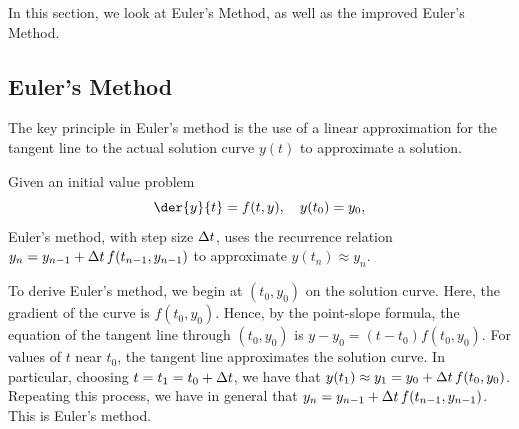 In this section, we look at Euler's Method, as well as the improved Euler's Method.

\subsection{Euler's Method}

The key principle in Euler's method is the use of a linear approximation for the tangent line to the actual solution curve $y(t)$ to approximate a solution.

\begin{recipe}
    Given an initial value problem \[\der{y}{t} = f(t, y), \quad y(t_0) = y_0,\] Euler's method,  with step size $\Delta t$, uses the recurrence relation $y_{n} = y_{n-1} + \Delta t \, f(t_{n-1}, y_{n-1})$ to approximate $y(t_n) \approx y_n$.
\end{recipe}

\begin{figure}[H]
    \centering
    \caption{}
\end{figure}

To derive Euler's method, we begin at $(t_0, y_0)$ on the solution curve. Here, the gradient of the curve is $f(t_0, y_0)$. Hence, by the point-slope formula, the equation of the tangent line through $(t_0, y_0)$ is $y - y_0 = (t - t_0) f(t_0, y_0)$. For values of $t$ near $t_0$, the tangent line approximates the solution curve. In particular, choosing $t = t_1 = t_0 + \Delta t$, we have that $y(t_1) \approx y_1 = y_0 + \Delta t \, f(t_0, y_0)$. Repeating this process, we have in general that $y_{n} = y_{n-1} + \Delta t \, f(t_{n-1}, y_{n-1})$. This is Euler's method.

